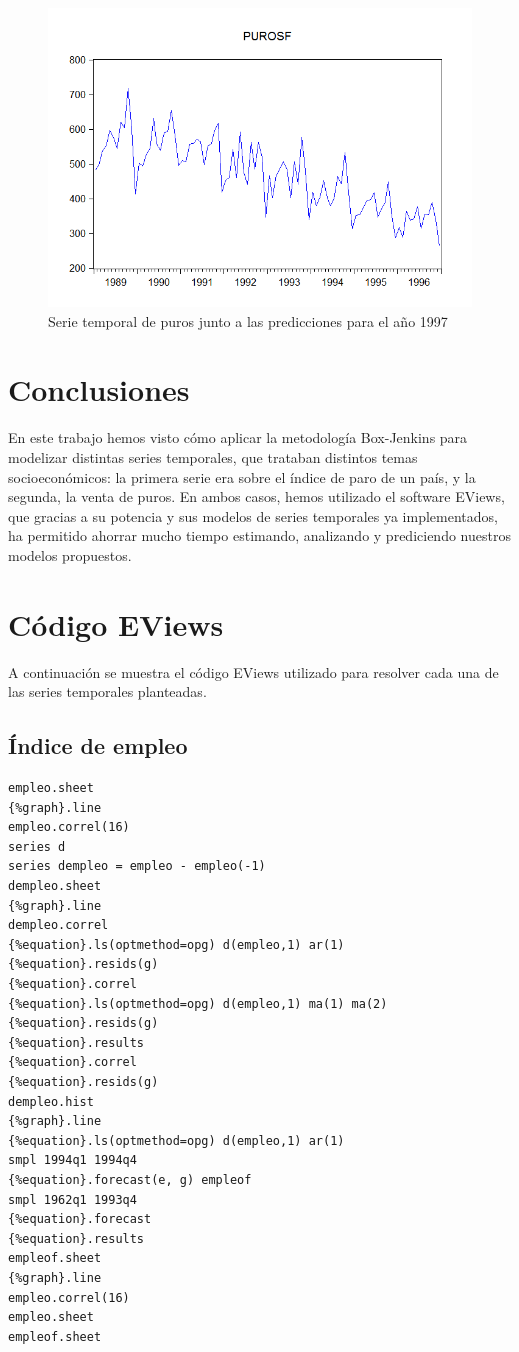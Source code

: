 \documentclass[12pt,a4paper,twoside,openright,titlepage,final]{article}
\begin{document}
\begin{figure}[tbph!]
	\centering
	\includegraphics[width=0.8\linewidth]{imagenes/puros/puros-predicciones.png}
	\caption{Serie temporal de puros junto a las predicciones para el año 1997}
	\label{fig:puros-predicciones}
\end{figure}


\clearpage
\section{Conclusiones}
En este trabajo hemos visto cómo aplicar la metodología Box-Jenkins para modelizar distintas series temporales, que trataban distintos temas socioeconómicos: la primera serie era sobre el índice de paro de un país, y la segunda, la venta de puros. En ambos casos, hemos utilizado el software EViews, que gracias a su potencia y sus modelos de series temporales ya implementados, ha permitido ahorrar mucho tiempo estimando, analizando y prediciendo nuestros modelos propuestos.

\clearpage
\section{Código EViews}

A continuación se muestra el código EViews utilizado para resolver cada una de las series temporales planteadas.

\subsection{Índice de empleo}

\begin{verbatim}
empleo.sheet
{%graph}.line
empleo.correl(16)
series d
series dempleo = empleo - empleo(-1)
dempleo.sheet
{%graph}.line
dempleo.correl
{%equation}.ls(optmethod=opg) d(empleo,1) ar(1)
{%equation}.resids(g)
{%equation}.correl
{%equation}.ls(optmethod=opg) d(empleo,1) ma(1) ma(2)
{%equation}.resids(g)
{%equation}.results
{%equation}.correl
{%equation}.resids(g)
dempleo.hist
{%graph}.line
{%equation}.ls(optmethod=opg) d(empleo,1) ar(1)
smpl 1994q1 1994q4
{%equation}.forecast(e, g) empleof
smpl 1962q1 1993q4
{%equation}.forecast 
{%equation}.results
empleof.sheet
{%graph}.line
empleo.correl(16)
empleo.sheet
empleof.sheet
\end{verbatim}
\end{document}
